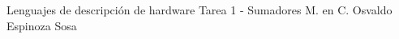 




	\pnormal
	{Lenguajes de descripción de hardware}
	{Tarea 1  - Sumadores}
	{M. en C. Osvaldo Espinoza Sosa}
	\tableofcontents
	
	\newpage 
	\newpage 
	\clearpage 
	\clearpage 
	\clearpage 
	\newpage 
	
	\newpage 



